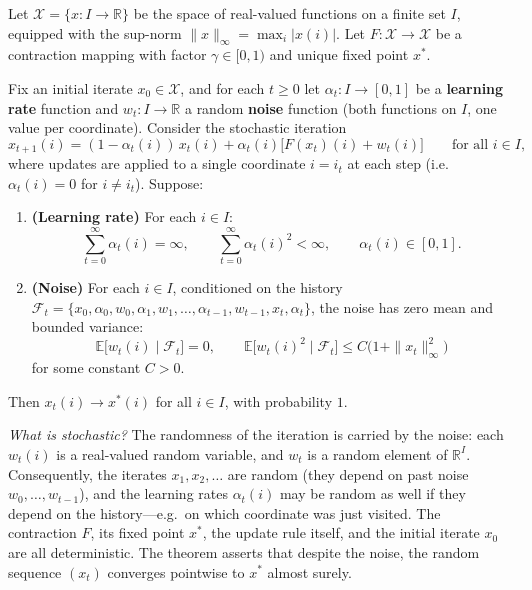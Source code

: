 \documentclass[11pt]{article}
\begin{document}
\begin{theorem}\label{thm:stochastic_approx}
Let $\mathcal{X} = \{x : I \to \mathbb{R}\}$ be the space of real-valued functions on a finite set $I$, equipped with the sup-norm $\|x\|_\infty = \max_i |x(i)|$. Let $F : \mathcal{X} \to \mathcal{X}$ be a contraction mapping with factor $\gamma \in [0,1)$ and unique fixed point $x^*$.

Fix an initial iterate $x_0 \in \mathcal{X}$, and for each $t \geq 0$ let $\alpha_t : I \to [0,1]$ be a \textbf{learning rate} function and $w_t : I \to \mathbb{R}$ a random \textbf{noise} function (both functions on $I$, one value per coordinate). Consider the stochastic iteration
$$
x_{t+1}(i) = (1 - \alpha_t(i))\, x_t(i) + \alpha_t(i)\bigl[F(x_t)(i) + w_t(i)\bigr] \qquad \text{for all } i \in I,
$$
where updates are applied to a single coordinate $i = i_t$ at each step (i.e.\ $\alpha_t(i) = 0$ for $i \neq i_t$). Suppose:
\begin{enumerate}
\item[(a)] \textbf{(Learning rate)} For each $i \in I$:
$$
\sum_{t=0}^{\infty} \alpha_t(i) = \infty, \qquad \sum_{t=0}^{\infty} \alpha_t(i)^2 < \infty, \qquad \alpha_t(i) \in [0,1].
$$
\item[(b)] \textbf{(Noise)} For each $i \in I$, conditioned on the history $\mathcal{F}_t = \{x_0, \alpha_0, w_0, \alpha_1, w_1, \ldots, \alpha_{t-1}, w_{t-1}, x_t, \alpha_t\}$, the noise has zero mean and bounded variance:
$$
\mathbb{E}\big[w_t(i) \mid \mathcal{F}_t\big] = 0, \qquad \mathbb{E}\big[w_t(i)^2 \mid \mathcal{F}_t\big] \le C\bigl(1 + \|x_t\|_\infty^2\bigr)
$$
for some constant $C > 0$.
\end{enumerate}
Then $x_t(i) \to x^*(i)$ for all $i \in I$, with probability $1$.
\end{theorem}

\emph{What is stochastic?}
The randomness of the iteration is carried by the noise: each $w_t(i)$ is a real-valued random variable, and $w_t$ is a random element of $\mathbb{R}^I$. Consequently, the iterates $x_1, x_2, \ldots$ are random (they depend on past noise $w_0, \ldots, w_{t-1}$), and the learning rates $\alpha_t(i)$ may be random as well if they depend on the history---e.g.\ on which coordinate was just visited. The contraction $F$, its fixed point $x^*$, the update rule itself, and the initial iterate $x_0$ are all deterministic. The theorem asserts that despite the noise, the random sequence $(x_t)$ converges pointwise to $x^*$ almost surely.
\end{document}
